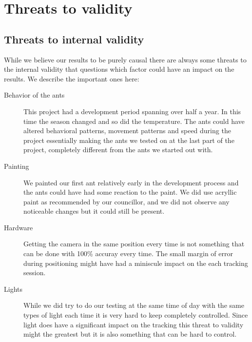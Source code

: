 
\section{Threats to validity}


\subsection{Threats to internal validity}

While we believe our results to be purely causal there are always some threats to the internal validity that questions which factor could have an impact on the results. We describe the important ones here:

\begin{description}
\item[Behavior of the ants] This project had a development period spanning over half a year. In this time the season changed and so did the temperature. The ants could have altered behavioral patterns, movement patterns and speed during the project essentially making the ants we tested on at the last part of the project, completely different from the ants we started out with. \\

\item[Painting] We painted our first ant relatively early in the development process and the ants could have had some reaction to the paint. We did use acryllic paint as recommended by our councillor, and we did not observe any noticeable changes but it could still be present. \\

\item[Hardware] Getting the camera in the same position every time is not something that can be done with 100\% accuray every time. The small margin of error during positioning might have had a miniscule impact on the each tracking session. \\

\item[Lights] While we did try to do our testing at the same time of day with the same types of light each time it is very hard to keep completely controlled. Since light does have a significant impact on the tracking this threat to validity might the greatest but it is also something that can be hard to control. \\    
\end{description}

